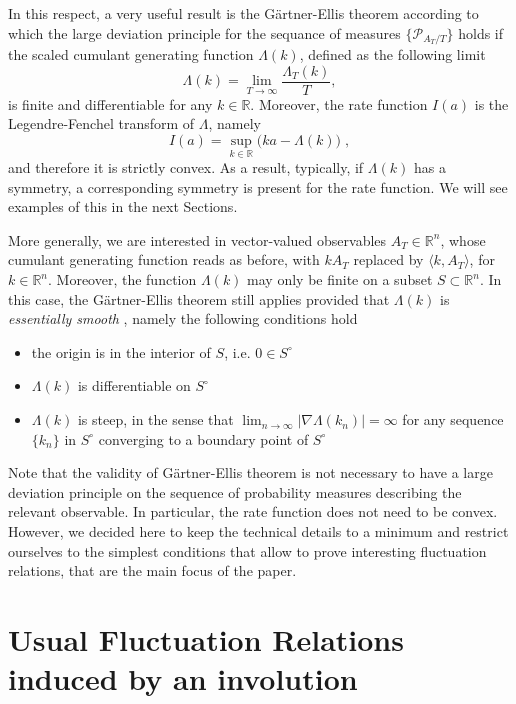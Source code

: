 \documentclass[a4paper,11pt]{article}
\numberwithin{equation}{section}
\begin{document}
In this respect, a very useful result is the G\"artner-Ellis theorem \cite{DZ98} according to which the large deviation principle for the sequance of measures $\{ \mathcal{P}_{A_T/T} \}$ holds if the scaled cumulant generating function $\Lambda(k)$, defined as the following limit 
$$\Lambda (k) = \lim_{T \to \infty} \frac{\Lambda_T (k)}{ T},$$
is finite and differentiable for any $k \in \mathbb{R}$. Moreover, the rate function $I(a)$ is the Legendre-Fenchel transform of $\Lambda$, namely
\begin{equation*}
   I(a) = \sup_{k \in \mathbb{R}} \big( k a - \Lambda(k) \big) \;,
\end{equation*}
and therefore it is strictly convex. As a result, typically, if $\Lambda (k)$ has a symmetry, a corresponding symmetry is present for the rate function. We will see examples of this in the next Sections. 

More generally, we are interested in vector-valued observables $A_T \in \mathbb{R}^n$, whose cumulant generating function reads as before, with $k A_T$ replaced by $\langle  k , A_T\rangle$, for $k \in \mathbb{R}^n$. Moreover, the function $\Lambda(k)$ may only be finite on a subset $S \subset \mathbb{R}^n$. In this case, the G\"artner-Ellis theorem still applies provided that $\Lambda(k)$ is \emph{essentially smooth} \cite{DZ98}, namely the following conditions hold
\begin{itemize}
    \item[(i)] the origin is in the interior of $S$, i.e. $0 \in S^\circ$
    \item[(ii)] $\Lambda(k)$ is differentiable on $S^\circ$  
    \item[(iii)] $\Lambda(k)$ is steep, in the sense that $\lim_{n \to \infty} |\nabla \Lambda(k_n)| = \infty$ for any sequence $\{ k_n\}$ in $S^\circ$ converging to a boundary point of $S^\circ$
\end{itemize}



Note that the validity of G\"artner-Ellis theorem is not necessary to have a large deviation principle on the sequence of probability measures describing the relevant observable. In particular, the rate function does not need to be convex.  However, we decided here to keep the technical details to a minimum and restrict ourselves to the simplest conditions that allow to prove interesting fluctuation relations, that are the main focus of the paper.


\section{Usual Fluctuation Relations induced by an involution}
\label{sec:Inv}
\end{document}
